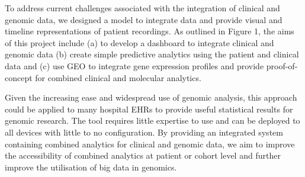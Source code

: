 \documentclass{bioinfo}
\begin{document}
To address current challenges associated with the integration of clinical and genomic data, we designed a model to integrate data and provide visual and timeline representations of patient recordings. As outlined in Figure 1, the aims of this project include (a) to develop a dashboard to integrate clinical and genomic data (b) create simple predictive analytics using the patient and clinical data and (c) use GEO to integrate gene expression profiles and provide proof-of-concept for combined clinical and molecular analytics. 

Given the increasing ease and widespread use of genomic analysis, this approach could be applied to many hospital EHRs to provide useful statistical results for genomic research. The tool requires little expertise to use and can be deployed to all devices with little to no configuration. By providing an integrated system containing combined analytics for clinical and genomic data, we aim to improve the accessibility of combined analytics at patient or cohort level and further improve the utilisation of big data in genomics. 
\end{document}
